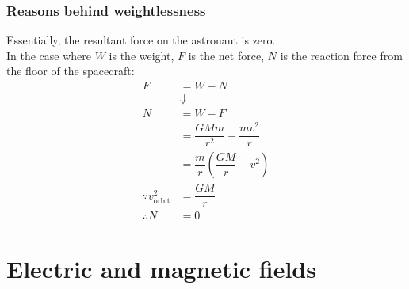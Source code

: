 \subsubsection*{Reasons behind weightlessness}
Essentially, the resultant force on the astronaut is zero. \\
In the case where $W$ is the weight, $F$ is the net force, $N$ is the reaction force from the floor of the spacecraft:
\[
\begin{aligned}
  F&=W-N\\
  &\Downarrow\\
  N&=W-F\\
  &=\dfrac{GMm}{r^2}-\dfrac{mv^2}{r}\\
  &=\dfrac{m}{r}\left(\dfrac{GM}{r}-v^2\right)\\
  \because v^2_\text{orbit}&=\dfrac{GM}{r}\\
  \therefore N&=0
\end{aligned}
\]
\section{Electric and magnetic fields}
